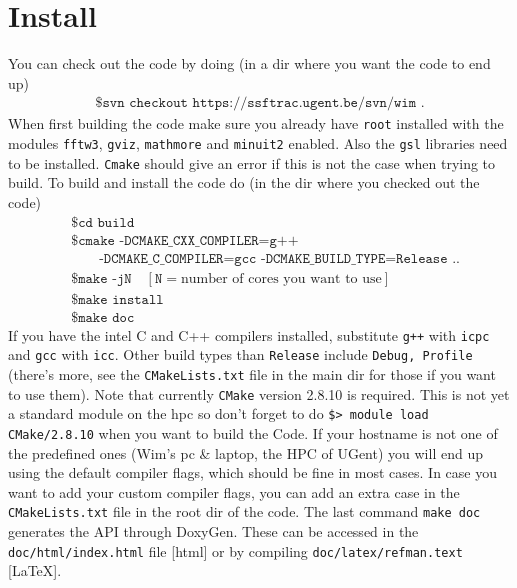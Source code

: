 \section{Install}
You can check out the code by doing (in a dir where you want the code to end up)
\begin{align*}
	\texttt{\$ svn checkout https://ssftrac.ugent.be/svn/wim .}
\end{align*}
When first building the code make sure you already have \texttt{root} installed 
with the modules \texttt{fftw3}, \texttt{gviz}, \texttt{mathmore} and 
\texttt{minuit2} enabled.  Also the \texttt{gsl} libraries need to be 
installed. \texttt{Cmake} should give an error if this is not the case when 
trying to build. To build and install the code do (in the dir where you checked 
out the code)
\begin{align*}
    & \texttt{\$ cd build} \\
	& \texttt{\$ cmake -DCMAKE\_CXX\_COMPILER=g++}\\
 &\qquad \texttt{-DCMAKE\_C\_COMPILER=gcc 
-DCMAKE\_BUILD\_TYPE=Release ..} \\
	& \texttt{\$ make -jN}\quad [\texttt{N}= \text{number of cores you want 
to use}]\\
	& \texttt{\$ make install } \\
	& \texttt{\$ make doc } 
\end{align*}
If you have the intel C and C++ compilers installed, substitute \texttt{g++} 
with \texttt{icpc} and \texttt{gcc} with \texttt{icc}.  Other build types than 
\texttt{Release} include \texttt{Debug, Profile} (there's more, see the 
\texttt{CMakeLists.txt} file in the main dir for those if you want to use 
them). 
Note that currently \texttt{CMake} version 2.8.10 is required. This is not yet a 
standard module on the hpc so don't forget to do \texttt{\$> module load 
CMake/2.8.10} when you want to build the Code.  If your hostname is not one of 
the predefined ones (Wim's pc \& laptop, the HPC of UGent) you will end up 
using the default compiler flags, which should be fine in most cases.  In case 
you want to add your custom compiler flags, you can add an extra case in the 
\texttt{CMakeLists.txt} file in the root dir of the code.  The last command 
\texttt{make doc} generates the API through DoxyGen.  These can be accessed in 
the \texttt{doc/html/index.html} file [html] or by compiling 
\texttt{doc/latex/refman.text} [\LaTeX].

